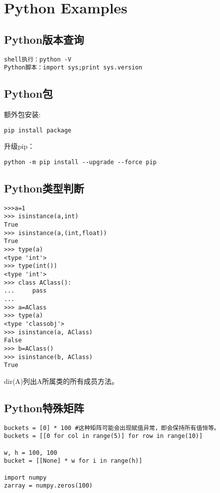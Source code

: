 
\section{Python Examples}
\subsection{Python版本查询}
\begin{verbatim}
shell执行：python -V
Python脚本：import sys;print sys.version
\end{verbatim}

\subsection{Python包}
额外包安装:
\begin{verbatim}
pip install package
\end{verbatim}

升级pip：
\begin{verbatim}
python -m pip install --upgrade --force pip
\end{verbatim}


\subsection{Python类型判断}
\begin{verbatim}
>>>a=1
>>> isinstance(a,int)
True
>>> isinstance(a,(int,float))
True
>>> type(a)
<type 'int'>
>>> type(int())
<type 'int'>
>>> class AClass():
...     pass
... 
>>> a=AClass
>>> type(a)
<type 'classobj'>
>>> isinstance(a, AClass)
False
>>> b=AClass()
>>> isinstance(b, AClass)
True
\end{verbatim}

dir(A)列出A所属类的所有成员方法。

\subsection{Python特殊矩阵}
\begin{verbatim}
buckets = [0] * 100 #这种矩阵可能会出现赋值异常，即会保持所有值恒等。
buckets = [[0 for col in range(5)] for row in range(10)]

w, h = 100, 100
bucket = [[None] * w for i in range(h)]

import numpy
zarray = numpy.zeros(100)


\end{verbatim}


